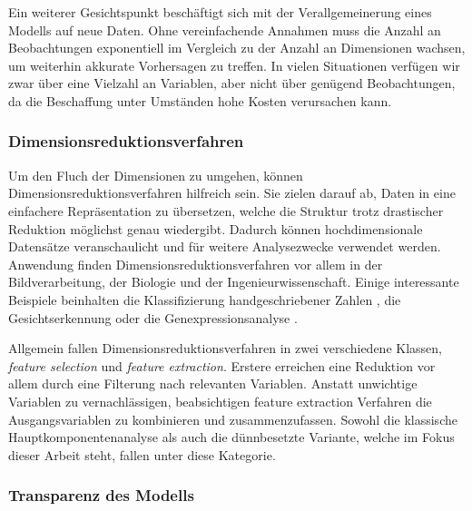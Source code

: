 Ein weiterer Gesichtspunkt beschäftigt sich mit der Verallgemeinerung eines Modells auf neue Daten. Ohne vereinfachende Annahmen muss die Anzahl an Beobachtungen exponentiell im Vergleich zu der Anzahl an Dimensionen wachsen, um weiterhin akkurate Vorhersagen zu treffen. In vielen Situationen verfügen wir zwar über eine Vielzahl an Variablen, aber nicht über genügend Beobachtungen, da die Beschaffung unter Umständen hohe Kosten verursachen kann. 




\subsubsection{Dimensionsreduktionsverfahren}

Um den Fluch der Dimensionen zu umgehen, können Dimensionsreduktionsverfahren hilfreich sein. Sie zielen darauf ab, Daten in eine einfachere Repräsentation zu übersetzen, welche die Struktur trotz drastischer Reduktion möglichst genau wiedergibt. Dadurch können hochdimensionale Datensätze veranschaulicht und für weitere Analysezwecke verwendet werden. Anwendung finden Dimensionsreduktionsverfahren vor allem in der Bildverarbeitung, der Biologie und der Ingenieurwissenschaft. Einige interessante Beispiele beinhalten die Klassifizierung handgeschriebener Zahlen \cite{hastie_elements}, die Gesichtserkennung \cite{hancock} oder die Genexpressionsanalyse \cite{alter}.

Allgemein fallen Dimensionsreduktionsverfahren in zwei verschiedene Klassen, \textit{feature selection} und \textit{feature extraction}. Erstere erreichen eine Reduktion vor allem durch eine Filterung nach relevanten Variablen. Anstatt unwichtige Variablen zu vernachlässigen, beabsichtigen feature extraction Verfahren die Ausgangsvariablen zu kombinieren und zusammenzufassen. Sowohl die klassische Hauptkomponentenanalyse als auch die dünnbesetzte Variante, welche im Fokus dieser Arbeit steht, fallen unter diese Kategorie.




\subsubsection{Transparenz des Modells}

